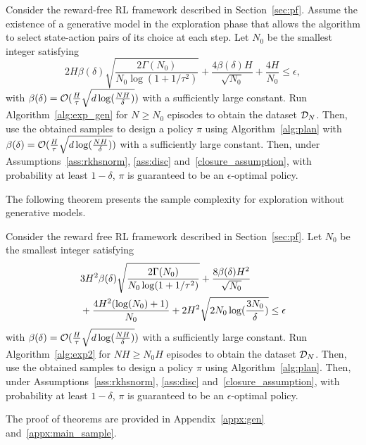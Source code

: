 \begin{theorem}\label{the:gen}
    Consider the reward-free RL framework described in Section~\ref{sec:pf}. Assume the existence of a generative model in the exploration phase that allows the algorithm to select state-action pairs of its choice at each step. Let $N_0$ be the smallest integer satisfying
    \begin{equation*}
2H\beta(\delta)\sqrt{\frac{2\Gamma(N_0)}{N_0\log(1+1/\tau^2)}} +\frac{4\beta(\delta)H}{\sqrt{N_0}} +\frac{4H}{N_0}\le \epsilon,
\end{equation*}
with $\beta(\delta) =\mathcal{O}(\frac{H}{\tau}\sqrt{d\log(\frac{NH}{\delta})})$ with a sufficiently large constant. 
Run Algorithm~\ref{alg:exp_gen} for $N\ge N_0$ episodes to obtain the dataset $\mathcal{D}_N$. Then, use the obtained samples to design a policy $\pi$ using Algorithm~\ref{alg:plan} with $\beta(\delta) =\mathcal{O}(\frac{H}{\tau}\sqrt{d\log(\frac{NH}{\delta})})$ with a sufficiently large constant. 
Then, under Assumptions~\ref{ass:rkhsnorm}, \ref{ass:disc} and~\ref{closure_assumption}, with probability at least $1-\delta$, $\pi$ is guaranteed to be an $\epsilon$-optimal policy. 
\end{theorem}

The following theorem presents the sample complexity for exploration without generative models. 


\begin{theorem}\label{the:main}
    Consider the reward free RL framework described in Section~\ref{sec:pf}. Let $N_0$ be the smallest integer satisfying
    \begin{align}\nonumber
    &3H^2\beta(\delta)\sqrt{\frac{2\Gamma(N_0)}{N_0\log(1+1/\tau^2)}} +\frac{8\beta(\delta)H^2}{\sqrt{N_0}} \\\label{eq:suboptgap}
    &+\frac{4H^2(\log(N_0)+1)}{N_0}+2H^2\sqrt{2N_0\log({\frac{3N_0}{\delta})}}\le \epsilon
\end{align}
with $\beta(\delta) =\mathcal{O}(\frac{H}{\tau}\sqrt{d\log(\frac{NH}{\delta})})$ with a sufficiently large constant.     Run Algorithm~\ref{alg:exp2} for $NH\ge N_0H$ episodes to obtain the dataset $\mathcal{D}_N$. Then, use the obtained samples to design a policy $\pi$ using Algorithm~\ref{alg:plan}. 
Then, under Assumptions~\ref{ass:rkhsnorm}, \ref{ass:disc} and~\ref{closure_assumption}, with probability at least $1-\delta$, $\pi$ is guaranteed to be an $\epsilon$-optimal policy. 
\end{theorem}
    

The proof of theorems are provided in Appendix~\ref{appx:gen} and~\ref{appx:main_sample}. 

